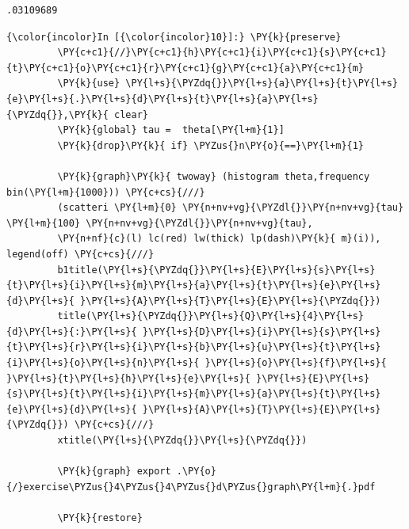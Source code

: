 \documentclass[11pt,notitlepage]{article}\usepackage[]{graphicx}\usepackage[]{color}
\makeatletter
\newenvironment{kframe}{%
 \def\at@end@of@kframe{}%
 \ifinner\ifhmode%
  \def\at@end@of@kframe{\end{minipage}}%
  \begin{minipage}{\columnwidth}%
 \fi\fi%
 \def\FrameCommand##1{\hskip\@totalleftmargin \hskip-\fboxsep
 \colorbox{shadecolor}{##1}\hskip-\fboxsep
     \hskip-\linewidth \hskip-\@totalleftmargin \hskip\columnwidth}%
 \MakeFramed {\advance\hsize-\width
   \@totalleftmargin\z@ \linewidth\hsize
   \@setminipage}}%
 {\par\unskip\endMakeFramed%
 \at@end@of@kframe}
\newenvironment{knitrout}{}{} %
\makeatother
\begin{document}
\begin{enumerate}[a)]
\begin{knitrout}
\begin{kframe}
    \begin{Verbatim}[commandchars=\\\{\}]
.03109689

    \end{Verbatim}

    \begin{Verbatim}[commandchars=\\\{\}]
{\color{incolor}In [{\color{incolor}10}]:} \PY{k}{preserve}
         \PY{c+c1}{//}\PY{c+c1}{h}\PY{c+c1}{i}\PY{c+c1}{s}\PY{c+c1}{t}\PY{c+c1}{o}\PY{c+c1}{r}\PY{c+c1}{g}\PY{c+c1}{a}\PY{c+c1}{m}
         \PY{k}{use} \PY{l+s}{\PYZdq{}}\PY{l+s}{a}\PY{l+s}{t}\PY{l+s}{e}\PY{l+s}{.}\PY{l+s}{d}\PY{l+s}{t}\PY{l+s}{a}\PY{l+s}{\PYZdq{}},\PY{k}{ clear}
         \PY{k}{global} tau =  theta[\PY{l+m}{1}]
         \PY{k}{drop}\PY{k}{ if} \PYZus{}n\PY{o}{==}\PY{l+m}{1}
         
         \PY{k}{graph}\PY{k}{ twoway} (histogram theta,frequency bin(\PY{l+m}{1000})) \PY{c+cs}{///}
         (scatteri \PY{l+m}{0} \PY{n+nv+vg}{\PYZdl{}}\PY{n+nv+vg}{tau} \PY{l+m}{100} \PY{n+nv+vg}{\PYZdl{}}\PY{n+nv+vg}{tau}, 
         \PY{n+nf}{c}(l) lc(red) lw(thick) lp(dash)\PY{k}{ m}(i)), legend(off) \PY{c+cs}{///}
         b1title(\PY{l+s}{\PYZdq{}}\PY{l+s}{E}\PY{l+s}{s}\PY{l+s}{t}\PY{l+s}{i}\PY{l+s}{m}\PY{l+s}{a}\PY{l+s}{t}\PY{l+s}{e}\PY{l+s}{d}\PY{l+s}{ }\PY{l+s}{A}\PY{l+s}{T}\PY{l+s}{E}\PY{l+s}{\PYZdq{}}) 
         title(\PY{l+s}{\PYZdq{}}\PY{l+s}{Q}\PY{l+s}{4}\PY{l+s}{d}\PY{l+s}{:}\PY{l+s}{ }\PY{l+s}{D}\PY{l+s}{i}\PY{l+s}{s}\PY{l+s}{t}\PY{l+s}{r}\PY{l+s}{i}\PY{l+s}{b}\PY{l+s}{u}\PY{l+s}{t}\PY{l+s}{i}\PY{l+s}{o}\PY{l+s}{n}\PY{l+s}{ }\PY{l+s}{o}\PY{l+s}{f}\PY{l+s}{ }\PY{l+s}{t}\PY{l+s}{h}\PY{l+s}{e}\PY{l+s}{ }\PY{l+s}{E}\PY{l+s}{s}\PY{l+s}{t}\PY{l+s}{i}\PY{l+s}{m}\PY{l+s}{a}\PY{l+s}{t}\PY{l+s}{e}\PY{l+s}{d}\PY{l+s}{ }\PY{l+s}{A}\PY{l+s}{T}\PY{l+s}{E}\PY{l+s}{\PYZdq{}}) \PY{c+cs}{///}
         xtitle(\PY{l+s}{\PYZdq{}}\PY{l+s}{\PYZdq{}})
         
         \PY{k}{graph} export .\PY{o}{/}exercise\PYZus{}4\PYZus{}4\PYZus{}d\PYZus{}graph\PY{l+m}{.}pdf
         
         \PY{k}{restore}
\end{Verbatim}


\end{kframe}


\end{knitrout}
\end{enumerate}
\end{document}
